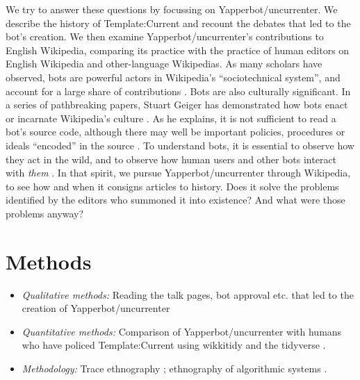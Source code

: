 \documentclass[Royal,times,sageh]{sagej}
\providecommand{\tightlist}{%
  \setlength{\itemsep}{0pt}\setlength{\parskip}{0pt}}
\begin{document}
We try to answer these questions by focussing on Yapperbot/uncurrenter.
We describe the history of Template:Current and recount the debates that
led to the bot's creation. We then examine Yapperbot/uncurrenter's
contributions to English Wikipedia, comparing its practice with the
practice of human editors on English Wikipedia and other-language
Wikipedias. As many scholars have observed, bots are powerful actors in
Wikipedia's ``sociotechnical system'', and account for a large share of
contributions
\citetext{\citealp{niederer_wisdom_2010}; \citealp[pp.~137-140]{dijck_culture_2013}; \citealp{geiger_work_2010}; \citealp{geiger_when_2013}; \citealp{geiger_operationalizing_2017}; \citealp{halfaker_bots_2012}; \citealp{livingstone_population_2016}}.
Bots are also culturally significant. In a series of pathbreaking
papers, Stuart Geiger has demonstrated how bots enact or incarnate
Wikipedia's culture
\citetext{\citealp{geiger_social_2009}; \citealp{geiger_lives_2011}; \citealp{geiger_are_2013}; \citealp{geiger_beyond_2017}; \citealp[see
also][]{kennedy_textual_2010}}. As he explains, it is not sufficient to
read a bot's source code, although there may well be important policies,
procedures or ideals ``encoded'' in the source
\citep[p.~9]{geiger_beyond_2017}. To understand bots, it is essential to
observe how they act in the wild, and to observe how human users and
other bots interact with \emph{them}
\citep{geiger_lives_2011, geiger_beyond_2017}. In that spirit, we pursue
Yapperbot/uncurrenter through Wikipedia, to see how and when it consigns
articles to history. Does it solve the problems identified by the
editors who summoned it into existence? And what were those problems
anyway?

\hypertarget{methods}{%
\section{Methods}\label{methods}}

\begin{itemize}
\tightlist
\item
  \emph{Qualitative methods:} Reading the talk pages, bot approval etc.
  that led to the creation of Yapperbot/uncurrenter
\item
  \emph{Quantitative methods:} Comparison of Yapperbot/uncurrenter with
  humans who have policed Template:Current using wikkitidy
  \citep{falk_wikkitidy_2023} and the tidyverse
  \citep{wickham_welcome_2019}.
\item
  \emph{Methodology:} Trace ethnography \citep{geiger_trace_2011};
  ethnography of algorithmic systems
  \citep{seaver_algorithms_2017, geiger_beyond_2017}.
\end{itemize}
\end{document}
